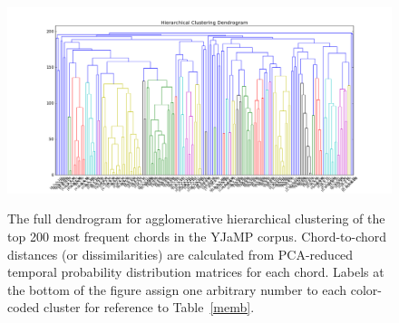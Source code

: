 \begin{landscape}
\begin{figure}
	\centering
	\caption{The full dendrogram for agglomerative hierarchical clustering of the top 200 most frequent chords in the YJaMP corpus.  Chord-to-chord distances (or dissimilarities) are calculated from PCA-reduced temporal probability distribution matrices for each chord.  Labels at the bottom of the figure assign one arbitrary number to each color-coded cluster for reference to Table~\ref{memb}.}
	\includegraphics[width=8.5in]{Dendrogram_complete.png}
	\label{Dend_complete}
\end{figure}
\end{landscape}

